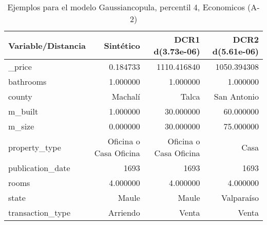 \begin{table}[H]
\centering
\fontsize{10}{14}\selectfont
\caption{Ejemplos para el modelo Gaussiancopula, percentil 4, Economicos (A-2)}
\label{table-example-economicos-a-2-gaussiancopula-4p}
\begin{tabular}{|l|r|r|r|}
\hline
\rowcolor[gray]{0.8}
Variable/Distancia & Sintético & DCR1 d(3.73e-06) & DCR2 d(5.61e-06) \\
\hline \_price & \cellcolor[rgb]{0.9, 0.54, 0.52} 0.184733 & 1110.416840 & 1050.394308 \\
\hline bathrooms & \cellcolor[rgb]{0.9, 0.54, 0.52} 1.000000 & \cellcolor[rgb]{0.9, 0.54, 0.52} 1.000000 & \cellcolor[rgb]{0.9, 0.54, 0.52} 1.000000 \\
\hline county & \cellcolor[rgb]{0.9, 0.54, 0.52} Machalí & Talca & San Antonio \\
\hline m\_built & \cellcolor[rgb]{0.9, 0.54, 0.52} 1.000000 & 30.000000 & 60.000000 \\
\hline m\_size & \cellcolor[rgb]{0.9, 0.54, 0.52} 0.000000 & 30.000000 & 75.000000 \\
\hline property\_type & \cellcolor[rgb]{0.9, 0.54, 0.52} Oficina o Casa Oficina & \cellcolor[rgb]{0.9, 0.54, 0.52} Oficina o Casa Oficina & Casa \\
\hline publication\_date & \cellcolor[rgb]{0.9, 0.54, 0.52} 1693 & \cellcolor[rgb]{0.9, 0.54, 0.52} 1693 & \cellcolor[rgb]{0.9, 0.54, 0.52} 1693 \\
\hline rooms & \cellcolor[rgb]{0.9, 0.54, 0.52} 4.000000 & \cellcolor[rgb]{0.9, 0.54, 0.52} 4.000000 & \cellcolor[rgb]{0.9, 0.54, 0.52} 4.000000 \\
\hline state & \cellcolor[rgb]{0.9, 0.54, 0.52} Maule & \cellcolor[rgb]{0.9, 0.54, 0.52} Maule & Valparaíso \\
\hline transaction\_type & \cellcolor[rgb]{0.9, 0.54, 0.52} Arriendo & Venta & Venta \\
\hline
\end{tabular}
\end{table}
